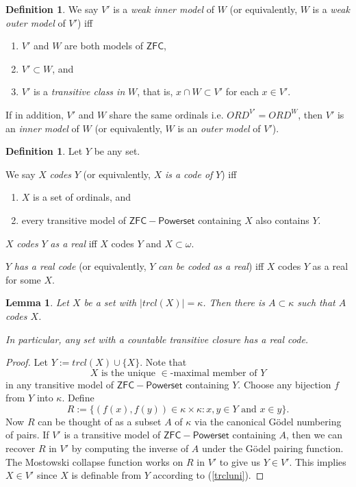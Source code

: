 \documentclass[12pt, twoside]{memoir}
\numberwithin{equation}{section}
\newtheorem{lem}[thm]{Lemma}
\theoremstyle{definition}
\newtheorem{defi}[thm]{Definition}
\theoremstyle{remark}
\theoremstyle{definition}
\theoremstyle{definition}
\theoremstyle{definition}
\theoremstyle{remark}
\begin{document}
\begin{defi}\label{inoutmodels}
We say $V'$ is a \emph{weak inner model} of $W$ (or equivalently, $W$ is a \emph{weak outer model} of $V'$) iff
\begin{enumerate}[label=(\alph*)]
    \item $V'$ and $W$ are both models of $\mathsf{ZFC}$,
    \item $V' \subset W$, and
    \item $V'$ is a \textit{transitive class in} $W$, that is, $x \cap W \subset V'$ for each $x \in V'$.
\end{enumerate}
If in addition, $V'$ and $W$ share the same ordinals i.e. $ORD^{V'} = ORD^W$, then $V'$ is an \emph{inner model} of $W$ (or equivalently, $W$ is an \emph{outer model} of $V'$).
\end{defi}
\begin{defi}
Let $Y$ be any set.

We say $X$ \emph{codes} $Y$ (or equivalently, $X$ \emph{is a code of} $Y$) iff 
\begin{enumerate}[label=(\alph*)]
    \item $X$ is a set of ordinals, and
    \item every transitive model of $\mathsf{ZFC - Powerset}$ containing $X$ also contains $Y$.
\end{enumerate}

$X$ \emph{codes} $Y$ \emph{as a real} iff $X$ codes $Y$ and $X \subset \omega$.

$Y$ \emph{has a real code} (or equivalently, $Y$ \emph{can be coded as a real}) iff $X$ codes $Y$ as a real for some $X$.
\end{defi}

\begin{lem}\label{setcode}
Let $X$ be a set with $|trcl(X)| = \kappa$. Then there is $A \subset \kappa$ such that $A$ codes $X$.

In particular, any set with a countable transitive closure has a real code.
\end{lem}

\begin{proof}
Let $Y := trcl(X) \cup \{X\}$. Note that 
\begin{equation}\label{trcluni}
    X \text{ is the unique } \! \in \!\text{-maximal member of } Y
\end{equation} 
in any transitive model of $\mathsf{ZFC - Powerset}$ containing $Y$. Choose any bijection $f$ from $Y$ into $\kappa$. Define $$R := \{(f(x), f(y)) \in \kappa \times \kappa : x, y \in Y \text{ and } x \in y\}.$$ Now $R$ can be thought of as a subset $A$ of $\kappa$ via the canonical G\"{o}del numbering of pairs. If $V'$ is a transitive model of $\mathsf{ZFC - Powerset}$ containing $A$, then we can recover $R$ in $V'$ by computing the inverse of $A$ under the G\"{o}del pairing function. The Mostowski collapse function works on $R$ in $V'$ to give us $Y \in V'$. This implies $X \in V'$ since $X$ is definable from $Y$ according to (\ref{trcluni}). 
\end{proof}
\end{document}
